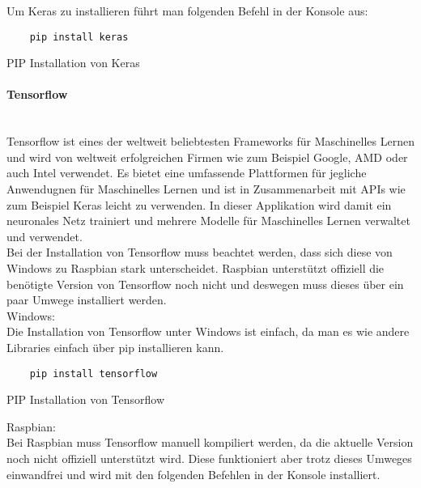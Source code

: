 Um Keras zu installieren führt man folgenden Befehl in der Konsole aus:

\begin{listing}[H]
    \begin{verbatim}
    pip install keras
    \end{verbatim}
    \caption{PIP Installation von Keras}
\end{listing}

\paragraph{Tensorflow}\mbox{}\\
Tensorflow ist eines der weltweit beliebtesten Frameworks für Maschinelles Lernen und wird von weltweit erfolgreichen Firmen wie 
zum Beispiel Google, AMD oder auch Intel verwendet. Es bietet eine umfassende Plattformen für jegliche Anwendugnen für Maschinelles Lernen 
und ist in Zusammenarbeit mit APIs wie zum Beispiel Keras leicht zu verwenden. In dieser Applikation wird damit ein neuronales 
Netz trainiert und mehrere Modelle für Maschinelles Lernen verwaltet und verwendet.\\

Bei der Installation von Tensorflow muss beachtet werden, dass sich diese von Windows zu Raspbian stark unterscheidet. 
Raspbian unterstützt offiziell die benötigte Version von Tensorflow noch nicht und deswegen muss dieses über ein paar Umwege installiert werden.\\

Windows:\\

Die Installation von Tensorflow unter Windows ist einfach, da man es wie andere Libraries einfach über pip installieren kann.

\begin{listing}[H]
    \begin{verbatim}
    pip install tensorflow
    \end{verbatim}
    \caption{PIP Installation von Tensorflow}
\end{listing}

Raspbian:\\

Bei Raspbian muss Tensorflow manuell kompiliert werden, da die aktuelle Version noch nicht offiziell unterstützt wird. Diese funktioniert 
aber trotz dieses Umweges einwandfrei und wird mit den folgenden Befehlen in der Konsole installiert.\\

